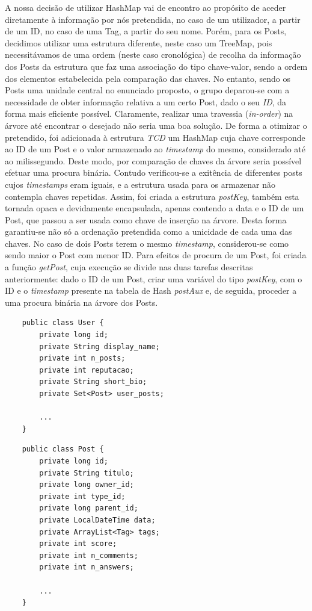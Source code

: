 \documentclass[a4paper, 11pt, oneside]{article}
\begin{document}
A nossa decisão de utilizar HashMap vai de encontro ao propósito de aceder diretamente à informação por nós pretendida, no caso de um utilizador, a partir de um ID, no caso
de uma Tag, a partir do seu nome. Porém, para os Posts, decidimos utilizar uma estrutura diferente, neste caso um TreeMap, pois necessitávamos de uma ordem (neste caso 
cronológica) de recolha da informação dos Posts da estrutura que faz uma associação do tipo chave-valor, sendo a ordem dos elementos estabelecida pela comparação das chaves. 
No entanto, sendo os Posts uma unidade central no enunciado proposto, o grupo deparou-se com a necessidade de obter informação relativa a um certo Post, dado o seu \textit{ID}, 
da forma mais eficiente possível. Claramente, realizar uma travessia (\textit{in-order}) na árvore até encontrar o desejado não seria uma boa solução. De forma a otimizar o 
pretendido, foi adicionada à estrutura \textit{TCD} um HashMap cuja chave corresponde ao ID de um Post e o valor armazenado ao \textit{timestamp} do mesmo, considerado até ao 
milissegundo. Deste modo, por comparação de chaves da árvore seria possível efetuar uma procura binária. Contudo verificou-se a exitência de diferentes posts cujos \textit{
timestamps} eram iguais, e a estrutura usada para os armazenar não contempla chaves repetidas. Assim, foi criada a estrutura \textit{postKey}, também esta tornada opaca e 
devidamente encapsulada, apenas contendo a data e o ID de um Post, que passou a ser usada como chave de inserção na árvore. Desta forma garantiu-se não só a ordenação pretendida 
como a unicidade de cada uma das chaves. No caso de dois Posts terem o mesmo \textit{timestamp}, considerou-se como sendo maior o Post com menor ID. Para efeitos de procura de 
um Post, foi criada a função \textit{getPost}, cuja execução se divide nas duas tarefas descritas anteriormente: dado o ID de um Post, criar uma variável do tipo 
\textit{postKey}, com o ID e o \textit{timestamp} presente na tabela de Hash \textit{postAux} e, de seguida, proceder a uma procura binária na árvore dos Posts.


\begin{lstlisting}
	public class User {	
	    private long id;
	    private String display_name;
	    private int n_posts;
	    private int reputacao;
	    private String short_bio;
	    private Set<Post> user_posts;

	    ...
	}
\end{lstlisting}

\begin{lstlisting}
	public class Post {
	    private long id;
	    private String titulo;
	    private long owner_id;
	    private int type_id;
	    private long parent_id;
	    private LocalDateTime data;
	    private ArrayList<Tag> tags;
	    private int score;
	    private int n_comments;
	    private int n_answers;

	    ...
	}
\end{lstlisting}
\end{document}
